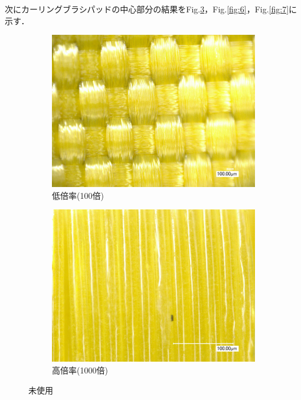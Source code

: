 \documentclass[main]{subfiles}
\begin{document}
次にカーリングブラシパッドの中心部分の結果をFig.\ref{fig:1}，Fig.\ref{fig:6}，Fig.\ref{fig:7}に示す．


\begin{figure}[H]
    \centering
    \begin{subfigure}[htbp]{0.45\linewidth}
        \centering
        \includegraphics[keepaspectratio, width=0.8\linewidth]{figures/縁/カーリングパッド未使用低倍率.jpg}
        \caption{低倍率(100倍)}
        \label{fig:label}
    \end{subfigure}
    \begin{subfigure}[htbp]{0.45\linewidth}
        \centering
        \includegraphics[keepaspectratio, width=0.8\linewidth]{figures/縁/カーリングパッド未使用.jpg}
        \caption{高倍率(1000倍)}
        \label{fig:label}
    \end{subfigure}
    \caption{未使用}
    \label{fig:1}
\end{figure}
\end{document}
